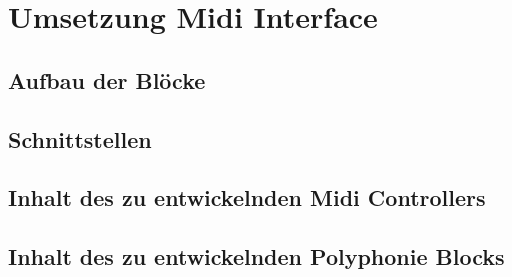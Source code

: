 \section{Umsetzung Midi Interface}\label{sect.midi_umsetzung}
\subsection{Aufbau der Blöcke}
\subsection{Schnittstellen}
\subsection{Inhalt des zu entwickelnden Midi Controllers}
\subsection{Inhalt des zu entwickelnden Polyphonie Blocks}
